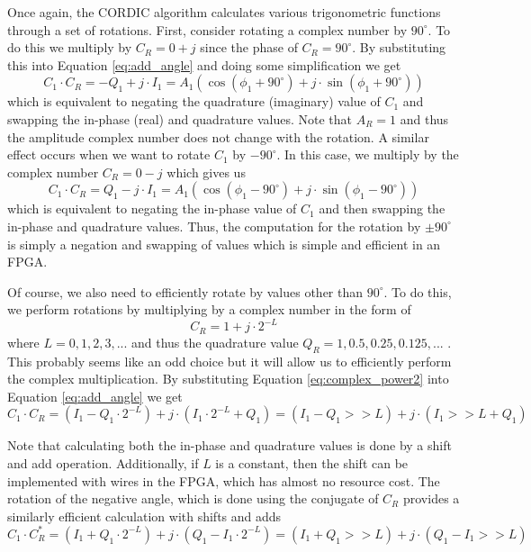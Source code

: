 Once again, the CORDIC algorithm calculates various trigonometric functions through a set of rotations. First, consider rotating a complex number by $90^{\circ}$. To do this we multiply by $C_R = 0 + j$ since the phase of $C_R = 90^{\circ}$.  By substituting this into Equation \ref{eq:add_angle} and doing some simplification we get
\begin{equation}
C_1 \cdot C_R = - Q_1 + j \cdot I_1 = A_1 (\cos (\phi_1 + 90^{\circ}) + j \cdot \sin(\phi_1 + 90^{\circ}))
\label{eq:plus90}
\end{equation}
which is equivalent to negating the quadrature (imaginary) value of $C_1$ and swapping the in-phase (real) and quadrature values. Note that $A_R = 1$ and thus the amplitude complex number does not change with the rotation.  A similar effect occurs when we want to rotate $C_1$ by $-90^{\circ}$. In this case, we multiply by the complex number $C_R = 0 - j$ which gives us
\begin{equation}
C_1 \cdot C_R = Q_1 - j \cdot I_1  = A_1 (\cos (\phi_1 -  90^{\circ}) + j \cdot \sin(\phi_1 -  90^{\circ}))
\label{eq:minus90}
\end{equation}
which is equivalent to negating the in-phase value of $C_1$ and then swapping the in-phase and quadrature values. Thus, the computation for the rotation by $\pm 90^{\circ}$ is simply a negation and swapping of values which is simple and efficient in an FPGA.

Of course, we also need to efficiently rotate by values other than $90^{\circ}$. To do this, we perform rotations by multiplying by a complex number in the form of 
\begin{equation}
C_R = 1 + j \cdot 2^{-L}
\label{eq:complex_power2}
\end{equation} where $L = 0, 1, 2, 3, ... $ and thus the quadrature value $Q_R = 1, 0.5, 0.25, 0.125, ...$ . This probably seems like an odd choice but it will allow us to efficiently perform the complex multiplication. By substituting Equation \ref{eq:complex_power2} into Equation \ref{eq:add_angle} we get
\begin{equation}
C_1 \cdot C_R = (I_1 - Q_1 \cdot 2^{-L}) + j \cdot (I_1 \cdot 2^{-L} + Q_1) = (I_1 - Q_1 >> L) + j \cdot (I_1 >> L + Q_1)
\end{equation}

Note that calculating both the in-phase and quadrature values is done by a shift and add operation.  Additionally, if $L$ is a constant, then the shift can be implemented with wires in the FPGA, which has almost no resource cost. The rotation of the negative angle, which is done using the conjugate of $C_R$ provides a similarly efficient calculation with shifts and adds
\begin{equation}
C_1 \cdot C_R^{*} = (I_1 + Q_1 \cdot 2^{-L}) + j \cdot (Q_1 - I_1 \cdot 2^{-L}) = (I_1 + Q_1 >> L) + j \cdot (Q_1 - I_1 >> L)
\end{equation}

